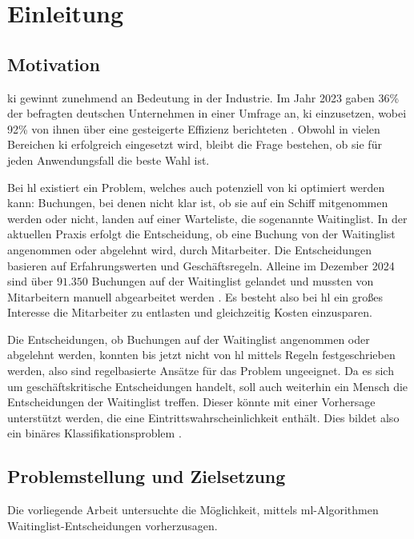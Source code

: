 \chapter{Einleitung}


\section{Motivation}
\gls{ki} gewinnt zunehmend an Bedeutung in der Industrie. 
Im Jahr 2023 gaben 36\% der befragten deutschen Unternehmen in einer Umfrage an, \gls{ki} einzusetzen, wobei 92\% von ihnen über eine gesteigerte Effizienz berichteten \cite{StrandPartners2024}.
Obwohl in vielen Bereichen \gls{ki} erfolgreich eingesetzt wird, bleibt die Frage bestehen, ob sie für jeden Anwendungsfall die beste Wahl ist.


Bei \gls{hl} existiert ein Problem, welches auch potenziell von \gls{ki} optimiert werden kann: 
Buchungen, bei denen nicht klar ist, ob sie auf ein Schiff mitgenommen werden oder nicht, landen auf einer Warteliste, die sogenannte Waitinglist. 
In der aktuellen Praxis erfolgt die Entscheidung, ob eine Buchung von der Waitinglist angenommen oder abgelehnt wird, durch Mitarbeiter. Die Entscheidungen basieren auf Erfahrungswerten und Geschäftsregeln.
Alleine im Dezember 2024 sind über $91.350$ Buchungen auf der Waitinglist gelandet und mussten von Mitarbeitern manuell abgearbeitet werden \cite{BALBOA2025}. 
Es besteht also bei \gls{hl} ein großes Interesse die Mitarbeiter zu entlasten und gleichzeitig Kosten einzusparen. 

Die Entscheidungen, ob Buchungen auf der Waitinglist angenommen oder abgelehnt werden, konnten bis jetzt nicht von \gls{hl} mittels Regeln festgeschrieben werden, also sind regelbasierte Ansätze für das Problem ungeeignet. 
Da es sich um geschäftskritische Entscheidungen handelt, soll auch weiterhin ein Mensch die Entscheidungen der Waitinglist treffen.
Dieser könnte mit einer Vorhersage unterstützt werden, die eine Eintrittswahrscheinlichkeit enthält.
Dies bildet also ein binäres Klassifikationsproblem \cite{wong2011comparing}.

\section{Problemstellung und Zielsetzung}
Die vorliegende Arbeit untersuchte die Möglichkeit, mittels \gls{ml}-Algorithmen Waitinglist-Entscheidungen vorherzusagen.

